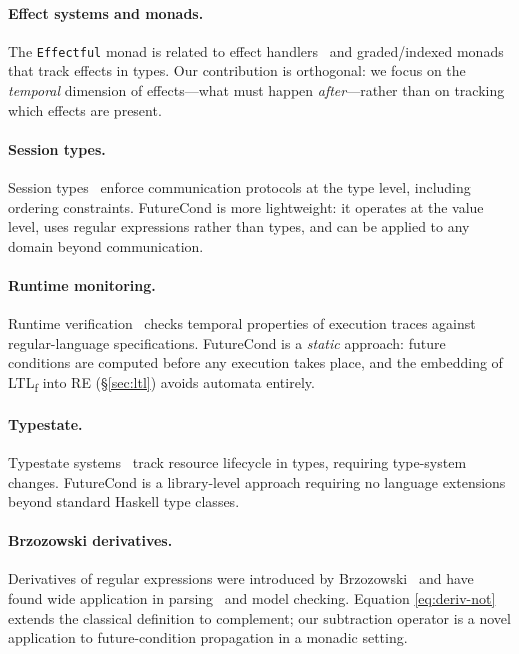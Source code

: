 \documentclass[acmsmall,screen]{acmart}
\begin{document}
\paragraph{Effect systems and monads.}
The \lstinline{Effectful} monad is related to effect handlers~\cite{pretnar2015}
and graded/indexed monads~\cite{orchard2014,katsumata2014} that track
effects in types. Our contribution is orthogonal: we focus on the
\emph{temporal} dimension of effects---what must happen \emph{after}---rather
than on tracking which effects are present.

\paragraph{Session types.}
Session types~\cite{honda1993,gay2010} enforce communication protocols
at the type level, including ordering constraints. FutureCond is more
lightweight: it operates at the value level, uses regular expressions
rather than types, and can be applied to any domain beyond communication.

\paragraph{Runtime monitoring.}
Runtime verification~\cite{leucker2009} checks temporal properties of
execution traces against regular-language specifications.
FutureCond is a \emph{static} approach: future conditions
are computed before any execution takes place, and the embedding of
LTL\textsubscript{f} into RE (\S\ref{sec:ltl}) avoids automata
entirely.

\paragraph{Typestate.}
Typestate systems~\cite{strom1986,bierhoff2007} track resource lifecycle
in types, requiring type-system changes. FutureCond is a library-level
approach requiring no language extensions beyond standard Haskell type
classes.

\paragraph{Brzozowski derivatives.}
Derivatives of regular expressions were introduced by
Brzozowski~\cite{brzozowski1964} and have found wide application in
parsing~\cite{owens2009,might2011} and model checking. Equation
\eqref{eq:deriv-not} extends the classical definition to complement;
our subtraction operator is a novel application to future-condition
propagation in a monadic setting.
\end{document}
